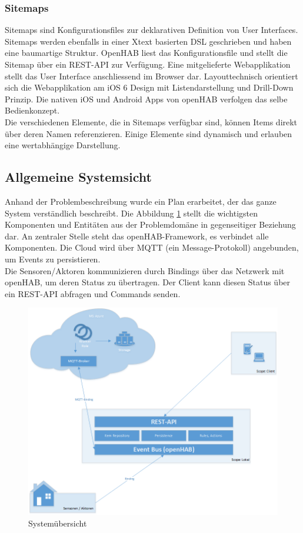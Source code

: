 \subsubsection{Sitemaps}
Sitemaps sind Konfigurationsfiles zur deklarativen Definition von User Interfaces. Sitemaps werden ebenfalls in einer Xtext basierten DSL geschrieben und haben eine baumartige Struktur. OpenHAB liest das Konfigurationsfile und stellt die Sitemap über ein REST-API zur Verfügung. Eine mitgelieferte Webapplikation stellt das User Interface anschliessend im Browser dar. Layouttechnisch orientiert sich die Webapplikation am iOS 6 Design mit Listendarstellung und Drill-Down Prinzip. Die nativen iOS und Android Apps von openHAB verfolgen das selbe Bedienkonzept.\\
Die verschiedenen Elemente, die in Sitemaps verfügbar sind, können Items direkt über deren Namen referenzieren. Einige Elemente sind dynamisch und erlauben eine wertabhängige Darstellung.

\subsection{Allgemeine Systemsicht}
Anhand der Problembeschreibung wurde ein Plan erarbeitet, der das ganze System verständlich beschreibt. Die Abbildung \ref{fig:systemView} stellt die wichtigsten Komponenten und Entitäten aus der Problemdomäne in gegenseitiger Beziehung dar. An zentraler Stelle steht das openHAB-Framework, es verbindet alle Komponenten. Die Cloud wird über MQTT (ein Message-Protokoll) angebunden, um Events zu persistieren.\\
Die Sensoren/Aktoren kommunizieren durch Bindings über das Netzwerk mit openHAB, um deren Status zu übertragen. Der Client kann diesen Status über ein REST-API abfragen und Commands senden.

\begin{figure}[H]
	\centering
		\includegraphics[scale=0.55]{report/img/systemuebersicht}
	\caption{Systemübersicht}
	\label{fig:systemView}
\end{figure}

